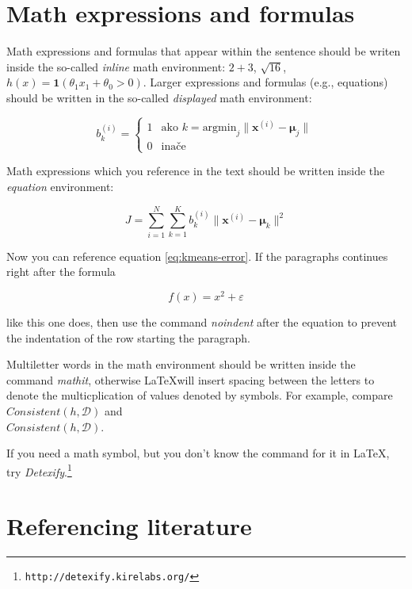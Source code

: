 \documentclass[10pt, a4paper]{article}
\begin{document}
\section{Math expressions and formulas}

Math expressions and formulas that appear within the sentence should be writen inside the so-called \emph{inline} math environment: $2+3$, $\sqrt{16}$, $h(x)=\mathbf{1}(\theta_1 x_1 + \theta_0>0)$. Larger expressions and formulas (e.g., equations) should be written in the so-called \emph{displayed} math environment:

\[
b^{(i)}_k = \begin{cases}
1 & \text{ako 
    $k = \text{argmin}_j \| \mathbf{x}^{(i)} - \mathbf{\mu}_j \|$}\\
0 & \text{inače}
\end{cases}
\]

Math expressions which you reference in the text should be written inside the \textit{equation} environment:

\begin{equation}\label{eq:kmeans-error}
J = \sum_{i=1}^N \sum_{k=1}^K 
b^{(i)}_k \| \mathbf{x}^{(i)} - \mathbf{\mu}_k \|^2
\end{equation}

Now you can reference equation \eqref{eq:kmeans-error}. If the paragraphs continues right after the formula

\begin{equation}
f(x) = x^2 + \varepsilon
\end{equation}

\noindent like this one does, then use the command \emph{noindent} after the equation to prevent the indentation of the row starting the paragraph. 

Multiletter words in the math environment should be written inside the command \emph{mathit}, otherwise \LaTeX will insert spacing between the letters to denote the multicplication of values denoted by symbols. For example, compare
$\mathit{Consistent}(h,\mathcal{D})$ and\\
$Consistent(h,\mathcal{D})$.

If you need a math symbol, but you don't know the command for it in \LaTeX, try
\emph{Detexify}.\footnote{\texttt{http://detexify.kirelabs.org/}}

\section{Referencing literature}
\end{document}
